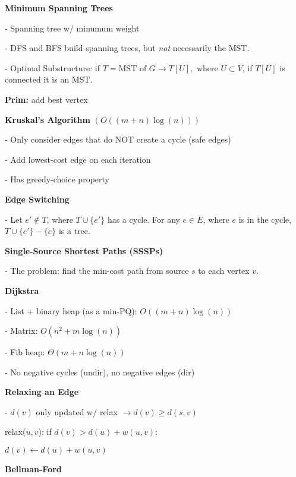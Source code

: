 \documentclass[letterpaper]{article}
\begin{document}
\begin{minipage}[t]{0.45\textwidth}

\textbf{Minimum Spanning Trees}

- Spanning tree w/ minumum weight

- DFS and BFS build spanning trees, but \emph{not} necessarily the MST.

- Optimal Substructure: if $T = \text{MST of } G \rightarrow T[U], \text{ where } U \subset V$, if $T[U]$ is connected it is an MST.

\textbf{Prim: } add best vertex

\textbf{Kruskal's Algorithm} $(O((m + n)\log(n)))$

- Only consider edges that do NOT create a cycle (safe edges)

- Add lowest-cost edge on each iteration

- Has greedy-choice property

\textbf{Edge Switching}

- Let $e' \notin T$, where $T \cup \{e'\}$ has a cycle. For any $e \in E$, where $e$ is in the cycle, $T \cup \{e'\} - \{e\}$ is a tree.

\textbf{Single-Source Shortest Paths (SSSPs)}

- The problem: find the min-cost path from source $s$ to each vertex $v$.

\textbf{Dijkstra}

- List + binary heap (as a min-PQ): $O((m+n)\log(n))$

- Matrix: $O(n^2 + m\log(n))$

- Fib heap: $\Theta(m + n\log(n))$

- No negative cycles (undir), no negative edges (dir)

\textbf{Relaxing an Edge}

- $d(v)$ only updated w/ relax $\rightarrow d(v) \geq d(s, v)$

relax($u, v$): if $d(v) > d(u) + w(u, v)$:

\hspace{0.5cm} $d(v) \leftarrow d(u) + w(u, v)$

\textbf{Bellman-Ford}




\end{minipage}
\end{document}
